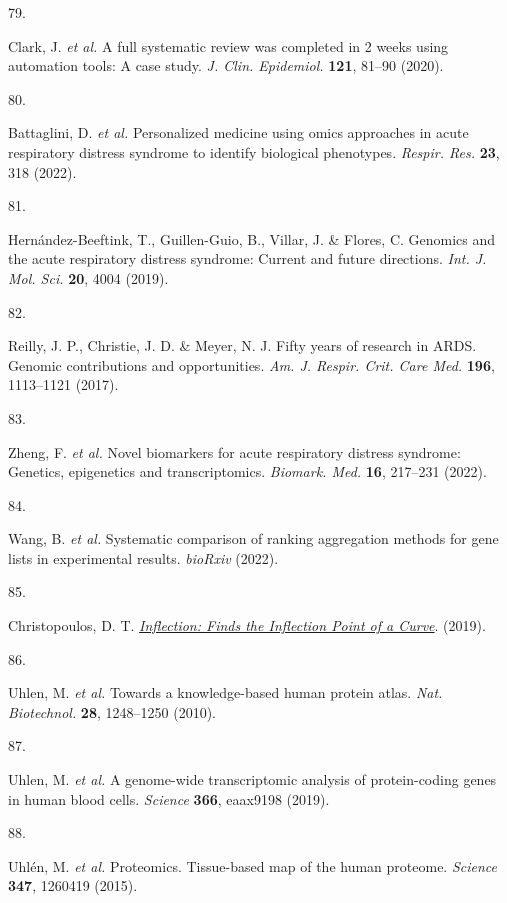 \documentclass[
  11,
  a4paper,
]{article}
\newlength{\cslhangindent}
\newlength{\csllabelwidth}
\newenvironment{CSLReferences}[2] %
 {\begin{list}{}{%
  \setlength{\itemindent}{0pt}
  \setlength{\leftmargin}{0pt}
  \setlength{\parsep}{0pt}
  \ifodd #1
   \setlength{\leftmargin}{\cslhangindent}
   \setlength{\itemindent}{-1\cslhangindent}
  \fi
  \setlength{\itemsep}{#2\baselineskip}}}
 {\end{list}}
\newcommand{\CSLLeftMargin}[1]{\parbox[t]{\csllabelwidth}{\strut#1\strut}}
\newcommand{\CSLRightInline}[1]{\parbox[t]{\linewidth - \csllabelwidth}{\strut#1\strut}}
\begin{document}
\begin{CSLReferences}{0}{0}
\CSLLeftMargin{79. }%
\CSLRightInline{Clark, J. \emph{et al.} A full systematic review was
completed in 2 weeks using automation tools: A case study. \emph{J.
Clin. Epidemiol.} \textbf{121}, 81--90 (2020).}

\CSLLeftMargin{80. }%
\CSLRightInline{Battaglini, D. \emph{et al.} Personalized medicine using
omics approaches in acute respiratory distress syndrome to identify
biological phenotypes. \emph{Respir. Res.} \textbf{23}, 318 (2022).}

\CSLLeftMargin{81. }%
\CSLRightInline{Hernández-Beeftink, T., Guillen-Guio, B., Villar, J. \&
Flores, C. Genomics and the acute respiratory distress syndrome: Current
and future directions. \emph{Int. J. Mol. Sci.} \textbf{20}, 4004
(2019).}

\CSLLeftMargin{82. }%
\CSLRightInline{Reilly, J. P., Christie, J. D. \& Meyer, N. J. Fifty
years of research in {ARDS}. Genomic contributions and opportunities.
\emph{Am. J. Respir. Crit. Care Med.} \textbf{196}, 1113--1121 (2017).}

\CSLLeftMargin{83. }%
\CSLRightInline{Zheng, F. \emph{et al.} Novel biomarkers for acute
respiratory distress syndrome: Genetics, epigenetics and
transcriptomics. \emph{Biomark. Med.} \textbf{16}, 217--231 (2022).}

\CSLLeftMargin{84. }%
\CSLRightInline{Wang, B. \emph{et al.} Systematic comparison of ranking
aggregation methods for gene lists in experimental results.
\emph{bioRxiv} (2022).}

\CSLLeftMargin{85. }%
\CSLRightInline{Christopoulos, D. T.
\emph{\href{https://CRAN.R-project.org/package=inflection}{Inflection:
Finds the Inflection Point of a Curve}}. (2019).}

\CSLLeftMargin{86. }%
\CSLRightInline{Uhlen, M. \emph{et al.} Towards a knowledge-based human
protein atlas. \emph{Nat. Biotechnol.} \textbf{28}, 1248--1250 (2010).}

\CSLLeftMargin{87. }%
\CSLRightInline{Uhlen, M. \emph{et al.} A genome-wide transcriptomic
analysis of protein-coding genes in human blood cells. \emph{Science}
\textbf{366}, eaax9198 (2019).}

\CSLLeftMargin{88. }%
\CSLRightInline{Uhlén, M. \emph{et al.} Proteomics. Tissue-based map of
the human proteome. \emph{Science} \textbf{347}, 1260419 (2015).}


\end{CSLReferences}
\end{document}
